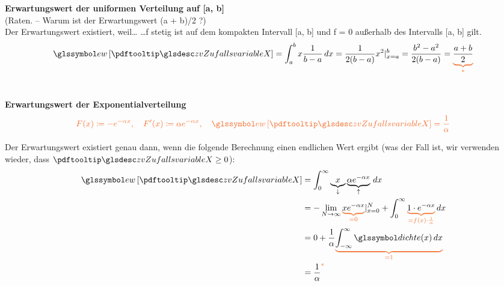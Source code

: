 \begin{bsp}
    \textbf{Erwartungswert der uniformen Verteilung auf [a, b]}   \\
    (Raten.
    – Warum ist der Erwartungswert (a + b)/2 ?)\\
    Der Erwartungswert existiert, weil\ldots
    \ldots f stetig ist auf dem kompakten Intervall [a, b]
    und f = 0 außerhalb des Intervalls [a, b] gilt.
    \[
        \E{\zvx } = \intab x \frac{1}{b-a} \dx = \frac{1}{2(b-a)} x^2 |^b_{x=a} = \frac{b^2 - a^2}{2(b-a)} = \oub{\frac{a+b}{2}}{*}
    \]
     \\
\end{bsp}
\begin{bsp}
    \textbf{Erwartungswert der Exponentialverteilung}   \\
    \[
        \txo{ F(x)\coloneqq - e^{-\alpha x}, \quad F'(x)\coloneqq \alpha e^{-\alpha x}, \quad \E{\zvx } = \frac{1}{\alpha}}
    \]

    Der Erwartungswert existiert genau dann, wenn die folgende Berechnung einen
    endlichen Wert ergibt (was der Fall ist, wir verwenden wieder, dass $\zvx \geq 0$):
    \begin{align*}
        \E{\zvx } & = \int^{\infty}_0 \underbrace{x}_{\downarrow} \underbrace{\alpha e^{- \alpha x}}_{\uparrow} \dx \\
        & = - \lim_{N \rightarrow \infty} \oub{x e^{- \alpha x}}{=0} |^N_{x=0} +  \int^{\infty}_0 \oub{1 \cdot  e^{- \alpha
        x} }{=f(x)\cdot \frac{1}{\alpha}} \dx \\
        & = 0 + \frac{1}{\alpha} \oub{\intinfs \dcht(x)\dx }{=1} \\
        & = \frac{1}{\alpha}^{\txo{*}}
    \end{align*}
    \txc{
        \begin{align*}
            * \dcht(x)& = \alpha e^{- \alpha x} \chaf_{[0,\infty)}(x)\\
            \Rightarrow \int_0^{\infty} e^{- \alpha x} \dx
            & = \frac{1}{\alpha} \int_0^{\infty} \alpha e^{- \alpha x} \dx \\
            & = \frac{1}{\alpha}  \intinfs \dcht(x)\dx \\
            & = \frac{1}{\alpha}
        \end{align*}
    }
\end{bsp}

